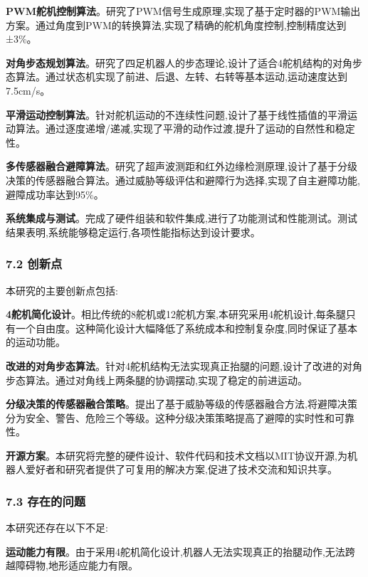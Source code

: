\documentclass[
]{article}
\begin{document}
\textbf{PWM舵机控制算法}。研究了PWM信号生成原理,实现了基于定时器的PWM输出方案。通过角度到PWM的转换算法,实现了精确的舵机角度控制,控制精度达到±3\%。

\textbf{对角步态规划算法}。研究了四足机器人的步态理论,设计了适合4舵机结构的对角步态算法。通过状态机实现了前进、后退、左转、右转等基本运动,运动速度达到7.5cm/s。

\textbf{平滑运动控制算法}。针对舵机运动的不连续性问题,设计了基于线性插值的平滑运动算法。通过逐度递增/递减,实现了平滑的动作过渡,提升了运动的自然性和稳定性。

\textbf{多传感器融合避障算法}。研究了超声波测距和红外边缘检测原理,设计了基于分级决策的传感器融合算法。通过威胁等级评估和避障行为选择,实现了自主避障功能,避障成功率达到95\%。

\textbf{系统集成与测试}。完成了硬件组装和软件集成,进行了功能测试和性能测试。测试结果表明,系统能够稳定运行,各项性能指标达到设计要求。

\hypertarget{ux521bux65b0ux70b9}{%
\subsubsection{7.2 创新点}\label{ux521bux65b0ux70b9}}

本研究的主要创新点包括:

\textbf{4舵机简化设计}。相比传统的8舵机或12舵机方案,本研究采用4舵机设计,每条腿只有一个自由度。这种简化设计大幅降低了系统成本和控制复杂度,同时保证了基本的运动功能。

\textbf{改进的对角步态算法}。针对4舵机结构无法实现真正抬腿的问题,设计了改进的对角步态算法。通过对角线上两条腿的协调摆动,实现了稳定的前进运动。

\textbf{分级决策的传感器融合策略}。提出了基于威胁等级的传感器融合方法,将避障决策分为安全、警告、危险三个等级。这种分级决策策略提高了避障的实时性和可靠性。

\textbf{开源方案}。本研究将完整的硬件设计、软件代码和技术文档以MIT协议开源,为机器人爱好者和研究者提供了可复用的解决方案,促进了技术交流和知识共享。

\hypertarget{ux5b58ux5728ux7684ux95eeux9898}{%
\subsubsection{7.3 存在的问题}\label{ux5b58ux5728ux7684ux95eeux9898}}

本研究还存在以下不足:

\textbf{运动能力有限}。由于采用4舵机简化设计,机器人无法实现真正的抬腿动作,无法跨越障碍物,地形适应能力有限。
\end{document}
